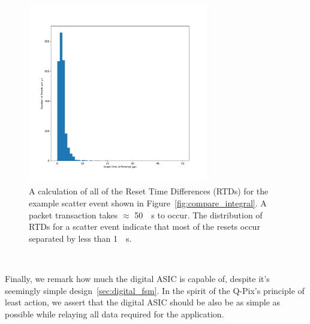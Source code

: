 \begin{figure}[]
\centering
\includegraphics[width=0.7\textwidth]{images/example_rtd_scatter.pdf}
\caption{A calculation of all of the Reset Time Differences (RTDs) for the example scatter event shown in Figure~\ref{fig:compare_integral}.
A packet transaction takes $\approx$ 50~\unit{\mu s} to occur.
The distribution of RTDs for a scatter event indicate that most of the resets occur separated by less than 1~\unit{\mu s}.
}
\end{figure}~\label{fig:example_rtd_scatter}

Finally, we remark how much the digital ASIC is capable of, despite it's seemingly simple design~\ref{sec:digital_fsm}.
In the spirit of the Q-Pix's principle of least action, we assert that the digital ASIC should be also be as simple as possible while relaying all data required for the application.
